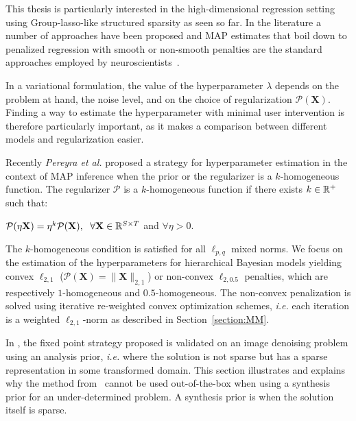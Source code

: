 This thesis is particularly interested in the high-dimensional regression setting using Group-\ac{lasso}-like structured sparsity as seen so far. In the literature a number of approaches have been proposed and MAP estimates that boil down to penalized regression with smooth or non-smooth penalties are the standard approaches employed by neuroscientists~\cite{haufe2008combining,ou2009distributed, bolstad2009space, wipf2009unified,gramfort2012mixed,lucka2012hierarchical,valdes2009eeg}.

In a variational formulation, the value of the hyperparameter $\lambda$ depends on the problem at hand, the noise level, and on the choice of regularization $\mathcal{P}(\mathbf{X})$.
Finding a way to estimate the hyperparameter with minimal user intervention is therefore particularly important, as it makes a comparison between different models and regularization easier.

Recently \textit{Pereyra et al.} \cite{Figueiredo} proposed a strategy for hyperparameter estimation in the context of MAP inference when the prior or the regularizer is a $k$-homogeneous function. The regularizer $\mathcal{P}$ is a $k$-homogeneous function if there exists $k\in\mathbb{R}^+$ such that:\\
\begin{center}
 $\mathcal{P}(\eta \mathbf{X}) = \eta^k\mathcal{P}(\mathbf{X}),
 \hspace{6pt} \forall \mathbf{X}\in\mathbb{R}^{S\times T}$  \hspace{4pt} and \hspace{4pt}  $\forall \eta > 0$.
 \end{center}

The $k$-homogeneous condition is satisfied for all $\ell_{p,q}$ mixed norms. We focus on the estimation of the hyperparameters for hierarchical Bayesian models yielding convex $\ell_{2,1}$ ($\mathcal{P}(\mathbf{X})=\|\mathbf{X}\|_{2,1}$) or non-convex $\ell_{2,0.5}$ penalties, which are respectively $1$-homogeneous and $0.5$-homogeneous. The non-convex penalization is solved using iterative re-weighted convex optimization schemes, \textit{i.e.} each iteration is a weighted $\ell_{2,1}$-norm as described in Section~\ref{section:MM}.

In \cite{Figueiredo}, the fixed point strategy proposed is validated on an image denoising problem using an analysis prior, \textit{i.e.} where the solution is not sparse but has a sparse representation in some transformed domain. This section illustrates and explains why the method from~\cite{Figueiredo} cannot be used out-of-the-box when using a synthesis prior for an under-determined problem. A synthesis prior is when the solution itself is sparse.

